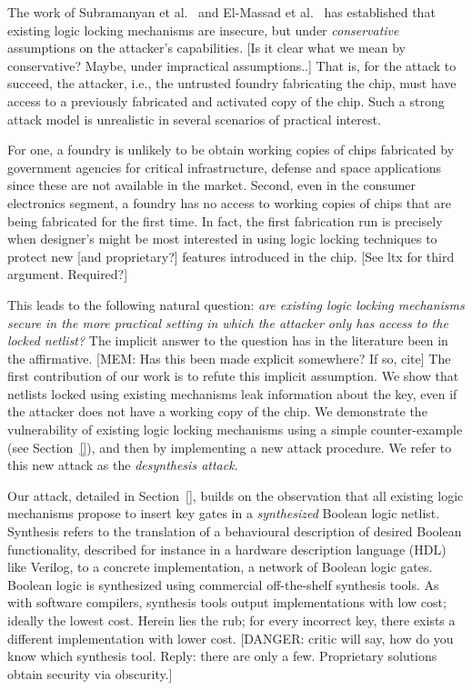 The work of 
Subramanyan et al.~\cite{} and El-Massad et al.~\cite{} 
has established that 
existing logic 
locking mechanisms are insecure, but 
under \emph{conservative}  
assumptions on the attacker's capabilities.
[Is it clear what we mean by conservative? Maybe, under impractical assumptions..] 
That is, for the
attack to succeed, the attacker, i.e., the untrusted foundry fabricating the chip, 
must have access to a previously fabricated and 
activated copy of the chip.
Such a strong attack model 
is unrealistic in several scenarios of 
practical interest. 

For one, a foundry is unlikely to 
be obtain working copies of 
chips fabricated by government agencies for 
critical infrastructure, defense and space applications 
since these are not available in the market.  
Second, even in the consumer electronics segment, a foundry 
has no access to working copies of
chips that are being fabricated for the first time. 
In fact, the first fabrication run is precisely 
when designer's 
might be most interested in using logic locking techniques to 
protect new [and proprietary?] features introduced in the chip. 
[See ltx for third argument. Required?]

This leads to the following natural question: \emph{are existing 
logic locking mechanisms secure in the more 
practical setting in which the attacker only has access to the 
locked netlist?} The implicit answer to the question 
has in the literature been in the affirmative. 
[MEM: Has this been made explicit somewhere? If so, cite]
The first contribution of our work is 
to refute this implicit assumption. 
We show that netlists locked using 
existing mechanisms leak information about the key, even if the attacker does not have a working copy of the chip.
We demonstrate the vulnerability 
of existing logic locking mechanisms using a simple counter-example (see Section~\ref{}), and then by implementing a new attack 
procedure. We refer to this new attack as the
\emph{desynthesis attack}. 

Our attack, detailed in 
Section~\ref{}, builds on the observation that all existing 
logic mechanisms propose to insert key gates 
in a \emph{synthesized} 
Boolean logic netlist. 
Synthesis refers to 
the translation 
of a behavioural description of 
desired Boolean functionality, described for instance in 
a hardware description language (HDL) like Verilog, to a 
concrete implementation, a network 
of Boolean logic gates. Boolean logic is 
synthesized using 
commercial off-the-shelf synthesis tools. As with software 
compilers, synthesis tools output implementations with low 
cost; ideally the lowest cost. 
Herein lies the rub; for every incorrect key, there 
exists a different implementation with lower cost.
[DANGER: critic will say, how do you know which synthesis tool. 
Reply: there are only a few. Proprietary solutions obtain security 
via obscurity.]


